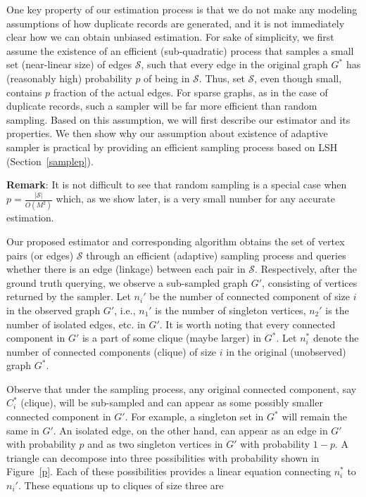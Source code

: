 \documentclass{imsart}
\begin{document}
One key property of our estimation process is that we do not make any modeling assumptions of how duplicate records are generated, and it is not immediately clear how we can obtain unbiased estimation. For sake of simplicity, we first assume the existence of an efficient (sub-quadratic) process that samples a small set (near-linear size) of edges $\mathcal{S}$, such that every edge in the original graph $G^*$ has (reasonably high) probability $p$ of being in $\mathcal{S}$. Thus, set $\mathcal{S}$, even though small, contains $p$ fraction of the actual edges. For sparse graphs, as in the case of duplicate records, such a sampler will be far more efficient than random sampling. Based on this assumption, we will first describe our estimator and its properties. We then show why our assumption about existence of adaptive sampler is practical by providing an efficient sampling process based on LSH (Section~\ref{samplep}).

\textbf{Remark}: It is not difficult to see that random sampling is a special case when $p = \frac{|\mathcal{S}|}{O(M^2)}$ which, as we show later, is a very small number for any accurate estimation.

Our proposed estimator and corresponding algorithm obtains the set of vertex pairs (or edges) $\mathcal{S}$  through an efficient (adaptive) sampling process and queries whether there is an edge (linkage) between each pair in $\mathcal{S}$.  Respectively, after the ground truth querying, we observe a sub-sampled graph $G'$, consisting of vertices returned by the sampler. Let $n_i'$ be the number of connected component of size $i$ in the observed graph $G'$, i.e., $n_1'$ is the number of singleton vertices, $n_2'$ is the number of isolated edges, etc. in $G'$. It is worth noting that every connected component in $G'$ is a part of some clique (maybe larger) in $G^*$.  Let $n_i^*$ denote the number of connected components (clique) of size $i$ in the original (unobserved) graph $G^*$.

Observe that under the sampling process, any original connected component, say $C_i^*$ (clique), will be sub-sampled and can appear as some possibly smaller connected component in $G'$. For example, a singleton set in $G^*$ will remain the same in $G'$. An isolated edge, on the other hand, can appear as an edge in $G'$ with probability $p$ and as two singleton vertices in $G'$ with probability $1-p$. A triangle can decompose into three possibilities with probability shown in Figure~\ref{p}. Each of these possibilities provides a linear equation connecting $n_i^*$ to $n_i'$. These equations up to cliques of size three are
\end{document}
